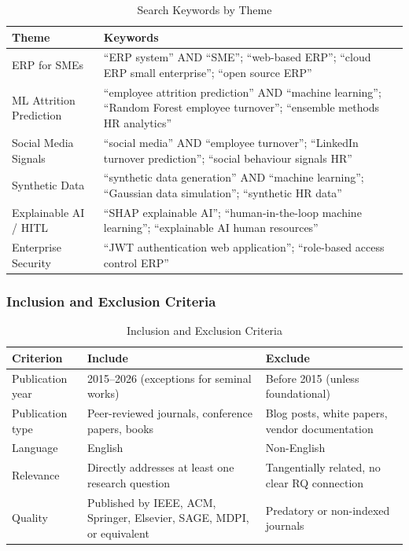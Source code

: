 \documentclass[12pt,a4paper]{article}
\begin{document}
\begin{table}[htbp]
\centering
\caption{Search Keywords by Theme}
\label{tab:search-keywords}
\begin{tabularx}{\textwidth}{L{3.2cm}X}
\toprule
\textbf{Theme} & \textbf{Keywords} \\
\midrule
ERP for SMEs & ``ERP system'' AND ``SME''; ``web-based ERP''; ``cloud ERP small enterprise''; ``open source ERP'' \\
\addlinespace
ML Attrition Prediction & ``employee attrition prediction'' AND ``machine learning''; ``Random Forest employee turnover''; ``ensemble methods HR analytics'' \\
\addlinespace
Social Media Signals & ``social media'' AND ``employee turnover''; ``LinkedIn turnover prediction''; ``social behaviour signals HR'' \\
\addlinespace
Synthetic Data & ``synthetic data generation'' AND ``machine learning''; ``Gaussian data simulation''; ``synthetic HR data'' \\
\addlinespace
Explainable AI / HITL & ``SHAP explainable AI''; ``human-in-the-loop machine learning''; ``explainable AI human resources'' \\
\addlinespace
Enterprise Security & ``JWT authentication web application''; ``role-based access control ERP'' \\
\bottomrule
\end{tabularx}
\end{table}

\subsubsection{Inclusion and Exclusion Criteria}
\label{sec:criteria}

\begin{table}[htbp]
\centering
\caption{Inclusion and Exclusion Criteria}
\label{tab:inclusion-exclusion}
\begin{tabularx}{\textwidth}{L{2.8cm}XX}
\toprule
\textbf{Criterion} & \textbf{Include} & \textbf{Exclude} \\
\midrule
Publication year & 2015--2026 (exceptions for seminal works) & Before 2015 (unless foundational) \\
\addlinespace
Publication type & Peer-reviewed journals, conference papers, books & Blog posts, white papers, vendor documentation \\
\addlinespace
Language & English & Non-English \\
\addlinespace
Relevance & Directly addresses at least one research question & Tangentially related, no clear RQ connection \\
\addlinespace
Quality & Published by IEEE, ACM, Springer, Elsevier, SAGE, MDPI, or equivalent & Predatory or non-indexed journals \\
\bottomrule
\end{tabularx}
\end{table}
\end{document}
